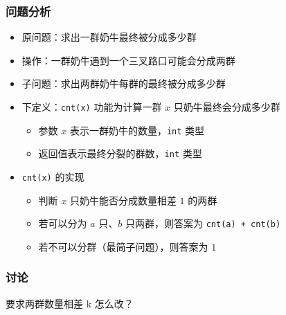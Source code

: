 \begin{frame}[fragile]
    \frametitle{问题分析}
     {
        \begin{itemize}
            \item<1-> 原问题：求出一群奶牛最终被分成多少群
            \item<2-> 操作：一群奶牛遇到一个三叉路口可能会分成两群
            \item<3-> 子问题：求出两群奶牛每群的最终被分成多少群
            \item<4-> 下定义：\lstinline|cnt(x)| 功能为计算一群 $x$ 只奶牛最终会分成多少群
                \begin{itemize}
                    \item 参数 $x$ 表示一群奶牛的数量，\lstinline|int| 类型
                    \item 返回值表示最终分裂的群数，\lstinline|int| 类型
                \end{itemize}
        \end{itemize}
    }
     {
        \begin{itemize}
            \item \lstinline|cnt(x)| 的实现
                \begin{itemize}
                    \item 判断 $x$ 只奶牛能否分成数量相差 $1$ 的两群
                    \item 若可以分为 $a$ 只、$b$ 只两群，则答案为 \lstinline|cnt(a) + cnt(b)|
                    \item 若不可以分群（最简子问题），则答案为 $1$
                \end{itemize} 
        \end{itemize}
    }
     {
        
    }

\end{frame}

\begin{frame}[fragile]
    \frametitle{讨论}

    \begin{block}{}
        \vspace{.5cm}
        \begin{center}
            {\Large 要求两群数量相差 k 怎么改？}
        \end{center}
        \vspace{.5cm}
    \end{block}
\end{frame}

